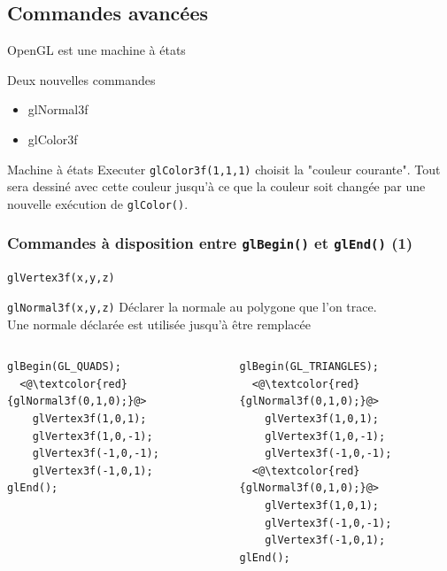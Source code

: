 \documentclass{beamer}
\begin{document}
\subsection{Commandes avancées}

\begin{frame}{OpenGL est une machine à états}
\begin{block}{Deux nouvelles commandes}
\begin{itemize}
\item glNormal3f
\item glColor3f
\end{itemize}
\end{block}
\begin{block}{Machine à états}
Executer \verb!glColor3f(1,1,1)! choisit la "couleur courante". Tout sera dessiné avec cette couleur jusqu'à ce que la couleur soit changée par une nouvelle exécution de \verb!glColor()!.
\end{block}
\end{frame}

\begin{frame}[fragile]
\frametitle{Commandes à disposition entre \verb!glBegin()! et \verb!glEnd()! (1)}
	\begin{block}{\verb!glVertex3f(x,y,z)!}
	\end{block}
	\begin{block}{\verb!glNormal3f(x,y,z)!}
		Déclarer la normale au polygone que l'on trace.\\
		\alert{Une normale déclarée est utilisée jusqu'à être remplacée}
		\begin{minipage}{\linewidth}
			\begin{columns}[T]
				\begin{column}{0.45\textwidth}
					\begin{exampleblock}{}
						\begin{lstlisting}[basicstyle=\small]
glBegin(GL_QUADS);
  <@\textcolor{red}{glNormal3f(0,1,0);}@>
    glVertex3f(1,0,1);
    glVertex3f(1,0,-1);
    glVertex3f(-1,0,-1);
    glVertex3f(-1,0,1);
glEnd();
						\end{lstlisting}
					\end{exampleblock}
				\end{column}
				\begin{column}{0.45\textwidth}
					\begin{exampleblock}{}
						\begin{lstlisting}[basicstyle=\small]
glBegin(GL_TRIANGLES);
  <@\textcolor{red}{glNormal3f(0,1,0);}@>
    glVertex3f(1,0,1);
    glVertex3f(1,0,-1);
    glVertex3f(-1,0,-1);
  <@\textcolor{red}{glNormal3f(0,1,0);}@>
    glVertex3f(1,0,1);
    glVertex3f(-1,0,-1);
    glVertex3f(-1,0,1);
glEnd();
						\end{lstlisting}
					\end{exampleblock}
				\end{column}
			\end{columns}
		\end{minipage}
	\end{block}
\end{frame}
\end{document}
